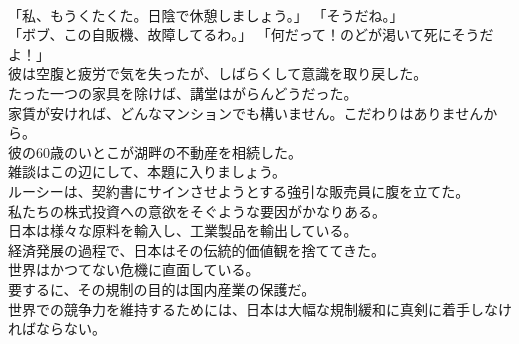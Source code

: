\documentclass[8pt]{extreport}
\begin{document}
\begin{CJK}{UTF8}{min}
\\	「私、もうくたくた。日陰で休憩しましょう。」 「そうだね。」	
\\	「ボブ、この自販機、故障してるわ。」 「何だって！のどが渇いて死にそうだよ！」	
\\	彼は空腹と疲労で気を失ったが、しばらくして意識を取り戻した。	
\\	たった一つの家具を除けば、講堂はがらんどうだった。	
\\	家賃が安ければ、どんなマンションでも構いません。こだわりはありませんから。	
\\	彼の60歳のいとこが湖畔の不動産を相続した。	
\\	雑談はこの辺にして、本題に入りましょう。	
\\	ルーシーは、契約書にサインさせようとする強引な販売員に腹を立てた。	
\\	私たちの株式投資への意欲をそぐような要因がかなりある。	
\\	日本は様々な原料を輸入し、工業製品を輸出している。	
\\	経済発展の過程で、日本はその伝統的価値観を捨ててきた。	
\\	世界はかつてない危機に直面している。	
\\	要するに、その規制の目的は国内産業の保護だ。	
\\	世界での競争力を維持するためには、日本は大幅な規制緩和に真剣に着手しなければならない。	
\end{CJK}
\end{document}
